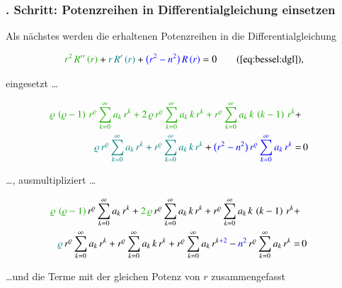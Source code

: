 \subsubsection{. Schritt: Potenzreihen in Differentialgleichung  einsetzen}
\begin{normalsize}%
Als n\"achstes werden die erhaltenen Potenzreihen in die Differentialgleichung
\end{normalsize}
\begin{align*}
	\textcolor{mygreen}{r^2 \, R'' \left( r \right)}
	+
	\textcolor{teal}{r \, R' \left( r \right)}
	+
	\textcolor{blue}{\big( r^2 - n^2 \big) \, R \left( r \right)}
	=
	0
	\tag{\ref{eq:bessel:dgl}}
	\text{,}
\end{align*}
\begin{normalsize}%
eingesetzt \dots
\end{normalsize}
\begin{align*}	
	\textcolor{mygreen}{
		\varrho \, \left( \varrho - 1 \right) \, r^{\varrho}
		\sum_{k=0}^{\infty} a_k \, r^k
		+
		2 \, \varrho \, r^{\varrho}
		\sum_{k=0}^{\infty} a_k \, k \, r^k
		+
		r^{\varrho}
		\sum_{k=0}^{\infty} a_k \, k \, \left( k - 1 \right) \, r^k
	}
	+ \\
	\textcolor{teal}{
		\varrho \, r^{\varrho}
		\sum_{k=0}^{\infty} a_k \, r^k
		+
		r^{\varrho}
		\sum_{k=0}^{\infty} a_k \, k \, r^k
	}
	+ 
	\textcolor{blue}{
		\big(
		r^2 - n^2
		\big) \,
		r^{\varrho}
		\sum_{k=0}^{\infty} a_k \, r^k
	}
	= & \, 0
\end{align*}
\begin{normalsize}%
\dots , ausmultipliziert \dots
\end{normalsize}
\begin{align*}
	\textcolor{mygreen}{	\varrho \, \left( \varrho - 1 \right)} 
	\, r^{\varrho}
	\sum_{k=0}^{\infty} a_k \, r^k
	+
	\textcolor{mygreen}{2 \, \varrho}
	\, r^{\varrho}
	\sum_{k=0}^{\infty} a_k \, k \, r^k
	+
	r^{\varrho}
	\sum_{k=0}^{\infty} a_k \, k \, \left( k - 1 \right) \, r^k
	+ \\
	\textcolor{teal}{\varrho}
	\, r^{\varrho}
	\sum_{k=0}^{\infty} a_k \, r^k
	+
	r^{\varrho}
	\sum_{k=0}^{\infty} a_k \, k \, r^k
	+
	r^{\varrho}
		\sum_{k=0}^{\infty} a_k \, r^{k \textcolor{blue}{+ 2}}
	-
	\textcolor{blue}{n^2}
	\, r^{\varrho}
	\sum_{k=0}^{\infty} a_k \, r^k
	= & \, 0
\end{align*}
\begin{normalsize}%
\dots und die Terme mit der gleichen Potenz von $r$ zusammengefasst
\end{normalsize}
